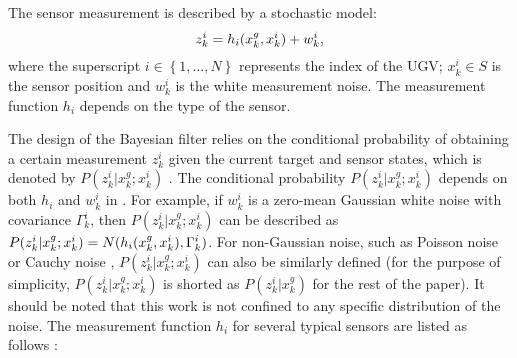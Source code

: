 	The sensor measurement is described by a stochastic model:
	\small\begin{equation}\label{eqn:meas_model}
		z^i_k = h_i(x^g_k,x^i_k)+w^i_k,
	\end{equation}\normalsize
	where the superscript $i\in\left\lbrace 1,\dots,N\right\rbrace$ represents the index of the UGV; $x^i_k\in S$ is the sensor position and $w^i_k$ is the white measurement noise.
	The measurement function $h_i$ depends on the type of the sensor. 
	
	The design of the Bayesian filter relies on the conditional probability of obtaining a certain measurement $z^i_k$ given the current target and sensor states, which is denoted by $P(z^i_k|x^g_k;x^i_k)$ \cite{thrun2005probabilistic}. 	
	The conditional probability $P(z^i_k|x^g_k;x^i_k)$ depends on both $h_i$ and $w^i_k$ in .
	For example, if $w^i_k$ is a zero-mean Gaussian white noise with covariance $\Gamma_k^i$, then $P(z^i_k|x^g_k;x^i_k)$ can be described as $P(z^i_k|x^g_k;x^i_k)=N(h_i(x^g_k,x^i_k),\Gamma_k^i)$.
	For non-Gaussian noise, such as Poisson noise or Cauchy noise \cite{kitagawa1996monte}, $P(z^i_k|x^g_k;x^i_k)$ can also be similarly defined (for the purpose of simplicity, $P(z^i_k|x^g_k;x^i_k)$ is shorted as $P(z^i_k|x^g_k)$ for the rest of the paper). 
	It should be noted that this work is not confined to any specific distribution of the noise.
	The measurement function $h_i$ for several typical sensors are listed as follows \cite{bishop2010optimality}:
	
